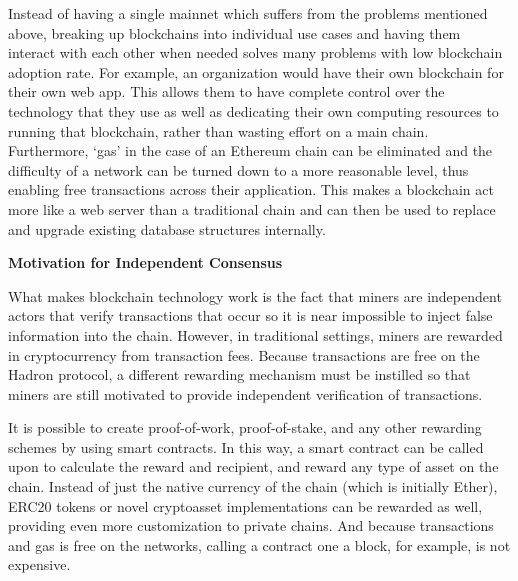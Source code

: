 \documentclass{%
	article}
\begin{document}
Instead of having a single mainnet which suffers from the problems mentioned above, breaking up blockchains into individual use cases and having them interact with each other when needed solves many problems with low blockchain adoption rate. For example, an organization would have their own blockchain for their own web app. This allows them to have complete control over the technology that they use as well as dedicating their own computing resources to running that blockchain, rather than wasting effort on a main chain. Furthermore, ‘gas’ in the case of an Ethereum chain can be eliminated and the difficulty of a network can be turned down to a more reasonable level, thus enabling free transactions across their application. This makes a blockchain act more like a web server than a traditional chain and can then be used to replace and upgrade existing database structures internally.

\begin{center}
\textbf{Motivation for Independent Consensus}
\end{center}

What makes blockchain technology work is the fact that miners are independent actors that verify transactions that occur so it is near impossible to inject false information into the chain. However, in traditional settings, miners are rewarded in cryptocurrency from transaction fees. Because transactions are free on the Hadron protocol, a different rewarding mechanism must be instilled so that miners are still motivated to provide independent verification of transactions\cite{verifincent}.

It is possible to create proof-of-work, proof-of-stake, and any other rewarding schemes by using smart contracts. In this way, a smart contract can be called upon to calculate the reward and recipient, and reward any type of asset on the chain. Instead of just the native currency of the chain (which is initially Ether), ERC20 tokens or novel cryptoasset implementations can be rewarded as well, providing even more customization to private chains. And because transactions and gas is free on the networks, calling a contract one a block, for example, is not expensive.
\end{document}
